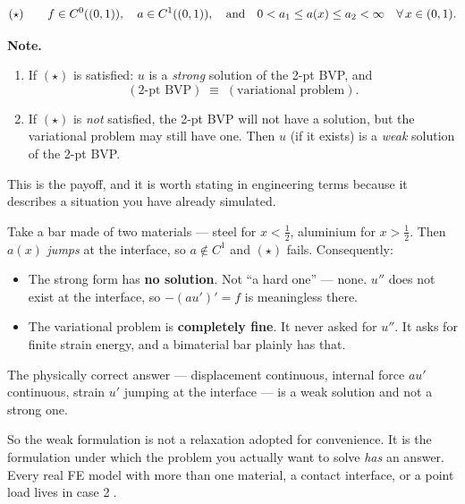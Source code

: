 \begin{equation}\label{eq:star}
  (\star)\qquad
  f\in\Ck[(0,1)]{0},\quad
  a\in\Ck[(0,1)]{1},\quad\text{and}\quad
  0<a_{1}\le a(x)\le a_{2}<\infty
  \quad \forall\, x\in(0,1).
\end{equation}

\noindent\textbf{Note.}
\begin{enumerate}[label=\textcircled{\scriptsize\arabic*},leftmargin=2.2em,itemsep=6pt]
  \item If $(\star)$ is satisfied: $u$ is a \emph{strong} solution of the
        2-pt BVP, and
        \[
          (\text{2-pt BVP}) \;\equiv\; (\text{variational problem}).
        \]
  \item If $(\star)$ is \emph{not} satisfied, the 2-pt BVP will not have a
        solution, but the variational problem may still have one.
        Then $u$ (if it exists) is a \emph{weak} solution of the 2-pt BVP.
\end{enumerate}

\begin{intuition}
This is the payoff, and it is worth stating in engineering terms because it
describes a situation you have already simulated.

Take a bar made of two materials --- steel for $x<\tfrac12$, aluminium for
$x>\tfrac12$. Then $a(x)$ \emph{jumps} at the interface, so $a\notin C^{1}$
and $(\star)$ fails. Consequently:
\begin{itemize}[leftmargin=1.4em,itemsep=2pt]
  \item The strong form has \textbf{no solution}. Not ``a hard one'' --- none.
        $u''$ does not exist at the interface, so $-(au')'=f$ is meaningless
        there.
  \item The variational problem is \textbf{completely fine}. It never asked for
        $u''$. It asks for finite strain energy, and a bimaterial bar plainly
        has that.
\end{itemize}
The physically correct answer --- displacement continuous, internal force
$au'$ continuous, strain $u'$ jumping at the interface --- is a weak solution
and not a strong one.

So the weak formulation is not a relaxation adopted for convenience. It is the
formulation under which the problem you actually want to solve \emph{has} an
answer. Every real FE model with more than one material, a contact interface, or
a point load lives in case \textcircled{\scriptsize2}.
\end{intuition}

